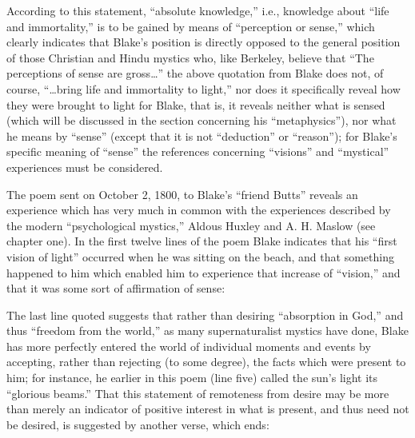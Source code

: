 
According to this statement, \enquote{absolute knowledge,} i.e., knowledge about
\enquote{life and immortality,} is to be gained by means of \enquote{perception or sense,} which clearly
indicates that Blake's position is directly opposed to the general position of those
Christian and Hindu mystics who, like Berkeley, believe that \enquote{The perceptions of sense are gross\dots}\supercite{keynes:william-blake}
the above quotation from Blake does not, of course, \enquote{\dots bring life and immortality to light,} nor does it specifically
reveal how they were brought to light for Blake, that is, it reveals neither
what is sensed (which will be discussed in the section concerning his \enquote{metaphysics}), nor
what he means by \enquote{sense} (except that it is not \enquote{deduction} or \enquote{reason}); for Blake's specific meaning of
\enquote{sense} the references concerning \enquote{visions} and \enquote{mystical} experiences must be considered.

The poem sent on October 2, 1800, to Blake's \enquote{friend Butts} reveals an experience which has very much in common with
the experiences described by the modern \enquote{psychological mystics,} Aldous Huxley and A. H. Maslow (see chapter one).
In the first twelve lines of the poem Blake indicates that his \enquote{first vision of light} occurred when he was sitting
on the beach, and that something happened to him which enabled him to experience that increase of \enquote{vision,} and that
it was some sort of affirmation of sense:

\label{self:26}


The last line quoted suggests that rather than desiring \enquote{absorption in God,} and thus \enquote{freedom from the world,}
as many supernaturalist mystics have done, Blake has more perfectly entered the world of individual moments and events
by accepting, rather than rejecting (to some degree), the facts which were present to him; for instance,
he earlier in this poem (line five) called the sun's light its \enquote{glorious beams.} That
this statement of remoteness from desire may be more than merely an indicator of positive interest in
what is present, and thus need not be desired, is suggested by another verse, which ends:


